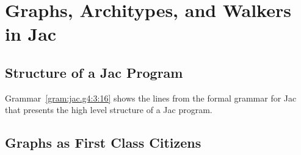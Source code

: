 \chapter{Graphs, Architypes, and Walkers in Jac}



\section{Structure of a Jac Program}

\par [Introduce structure of a jac program] \par
\par [Specify the differnce between graph architypes, graph instantiations, and walkers]\par
\par [Present simple program that utilizes the structures]\par
\par [Present variations on articulating the same program]\par
\par [Code blocks]\par

\begin{nerd}
    Grammar~\ref{gram:jac.g4:3:16} shows the lines from the formal grammar for Jac that presents the high level structure of a Jac program.
\end{nerd}

\section{Graphs as First Class Citizens}

\pagebreak
\par
{}
\par
{}


\pagebreak
\par
{}
\par
{}

\pagebreak
\par
{}
\par
{}

